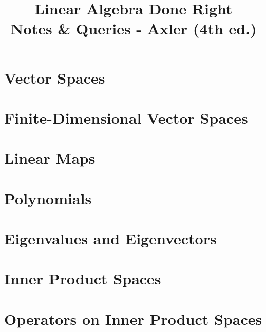 \documentclass[12pt]{article}
\title{\textbf{Linear Algebra Done Right}\\[0.4em]
       \large Notes \& Queries - Axler (4th ed.)}
\author{}
\date{}
\theoremstyle{definition}
\theoremstyle{plain}
\theoremstyle{remark}
\begin{document}
\maketitle
\tableofcontents
\newpage


\section{Vector Spaces}



\section{Finite-Dimensional Vector Spaces}



\section{Linear Maps}



\section{Polynomials}



\section{Eigenvalues and Eigenvectors}



\section{Inner Product Spaces}



\section{Operators on Inner Product Spaces}


\end{document}
